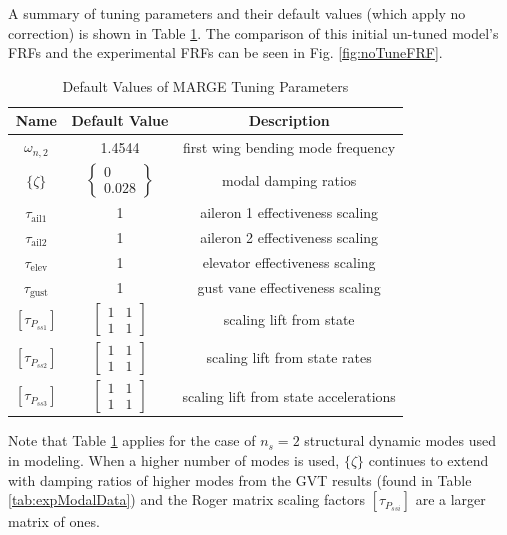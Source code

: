 A summary of tuning parameters and their default values (which apply no correction) is shown in Table \ref{tab:tuningParams}. The comparison of this initial un-tuned model's FRFs and the experimental FRFs can be seen in Fig. \ref{fig:noTuneFRF}.
\begin{table}[h]
	\centering
	\caption{Default Values of MARGE Tuning Parameters}
	\label{tab:tuningParams}
	\begin{tabular}{ccc}
		\hline\hline
		Name & Default Value & Description \\
		\hline
		$\omega_{n,2}$ & 1.4544 & first wing bending mode frequency \\
		$\{\zeta\}$ & $\begin{Bmatrix} 0 \\ 0.028 \end{Bmatrix}$ & modal damping ratios \\
		$\tau_\text{ail1}$ & 1 & aileron 1 effectiveness scaling \\
		$\tau_\text{ail2}$ & 1 & aileron 2 effectiveness scaling \\
		$\tau_\text{elev}$ & 1 & elevator effectiveness scaling \\
		$\tau_\text{gust}$ & 1 & gust vane effectiveness scaling \\
		$\left[\tau_{P_{ss1}}\right]$ & $\begin{bmatrix} 1 & 1 \\ 1 & 1 \end{bmatrix}$ & scaling lift from state \\
		$\left[\tau_{P_{ss2}}\right]$ & $\begin{bmatrix} 1 & 1 \\ 1 & 1 \end{bmatrix}$ & scaling lift from state rates \\
		$\left[\tau_{P_{ss3}}\right]$ & $\begin{bmatrix} 1 & 1 \\ 1 & 1 \end{bmatrix}$ & scaling lift from state accelerations \\
		\hline\hline
	\end{tabular}
\end{table}
Note that Table \ref{tab:tuningParams} applies for the case of $n_s=2$ structural dynamic modes used in modeling. When a higher number of modes is used, $\{\zeta\}$ continues to extend with damping ratios of higher modes from the GVT results (found in Table \ref{tab:expModalData}) and the Roger matrix scaling factors $[\tau_{P_{ssi}}]$ are a larger matrix of ones.

